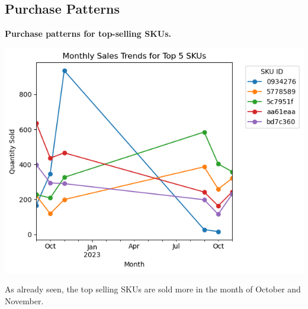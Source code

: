 \documentclass{article}
\begin{document}
    \subsection{Purchase Patterns}
    \textbf{Purchase patterns for top-selling SKUs.}
    \begin{center}
        \includegraphics[width=1\columnwidth]{images/month-sku.png}
    \end{center}
    \caption{As already seen, the top selling SKUs are sold more in the month of October and November.}
\end{document}
